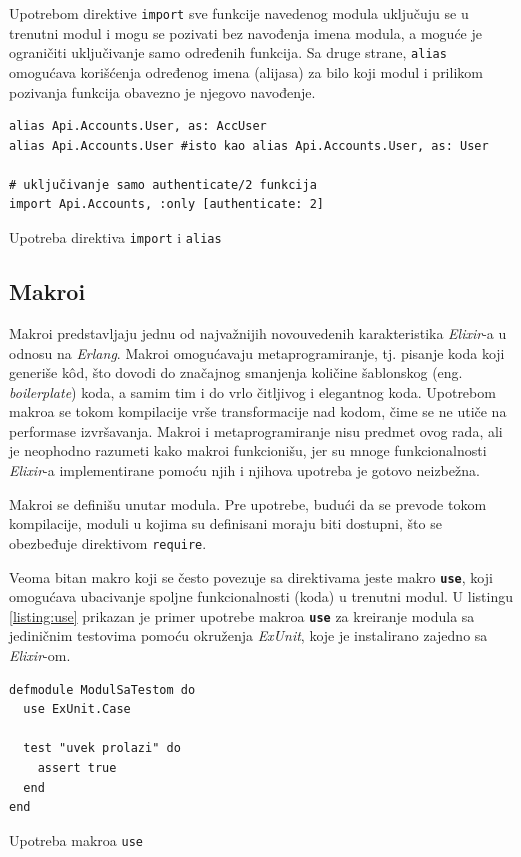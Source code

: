 \documentclass[12pt,oneside]{memoir}
\begin{document}
Upotrebom direktive \texttt{import} sve funkcije navedenog modula uključuju se u trenutni
modul i mogu se pozivati bez navođenja imena modula, a moguće je ograničiti uključivanje samo
određenih funkcija. Sa druge strane, \texttt{alias} omogućava korišćenja određenog imena
(alijasa) za bilo koji modul i prilikom pozivanja funkcija obavezno je njegovo navođenje.
\begin{listing}[h]
\begin{verbatim}
alias Api.Accounts.User, as: AccUser
alias Api.Accounts.User #isto kao alias Api.Accounts.User, as: User

# uključivanje samo authenticate/2 funkcija 
import Api.Accounts, :only [authenticate: 2] 
\end{verbatim}
\caption{Upotreba direktiva \texttt{import} i \texttt{alias}}
\label{listing:elixirAliasImport}
\end{listing}

\subsection{Makroi}
Makroi predstavljaju jednu od najvažnijih novouvedenih karakteristika \emph{Elixir}-a u odnosu na \emph{Erlang}.
Makroi omogućavaju metaprogramiranje, tj. pisanje koda koji generiše k\^{o}d, što dovodi do 
značajnog smanjenja količine šablonskog (eng. \emph{boilerplate}) koda, a samim tim i do
vrlo čitljivog i elegantnog koda. Upotrebom makroa se tokom kompilacije vrše transformacije
nad kodom, čime se ne utiče na performase izvršavanja. Makroi i metaprogramiranje nisu predmet
ovog rada, ali je neophodno razumeti kako makroi funkcionišu, jer su mnoge funkcionalnosti
\emph{Elixir}-a implementirane pomoću njih i njihova upotreba je gotovo neizbežna. 

Makroi se definišu unutar modula. Pre upotrebe, budući da se prevode tokom kompilacije, moduli
u kojima su definisani moraju biti dostupni, što se obezbeđuje direktivom \texttt{require}. 

Veoma bitan makro koji se često povezuje sa direktivama jeste makro \texttt{\textbf{use}},
koji omogućava ubacivanje spoljne funkcionalnosti (koda) u trenutni modul. U listingu 
\ref{listing:use} prikazan je primer upotrebe makroa \texttt{\textbf{use}} za kreiranje modula
sa jediničnim testovima pomoću okruženja \emph{ExUnit}, koje je instalirano zajedno sa \emph{Elixir}-om.
\begin{listing}[h]
\begin{verbatim}
defmodule ModulSaTestom do
  use ExUnit.Case

  test "uvek prolazi" do
    assert true
  end
end
\end{verbatim}
\caption{Upotreba makroa \texttt{use}}
\label{listing:use}
\end{listing}
  
\end{document}
